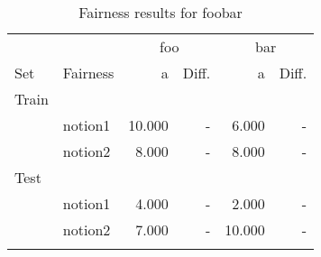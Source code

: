 \begin{table}[ht]
  \caption{Fairness results for foobar }%
  \begin{tabular}{llrrrr}
    \toprule
    & & \multicolumn{ 2 }{c}{ foo }& \multicolumn{ 2 }{c}{ bar } \\
    \cmidrule(lr){ 3-4}\cmidrule(l){ 5-6}
    Set & Fairness
    & a  & Diff.& a  & Diff. \\
    \midrule
      Train\\
      & notion1
      & 10.000 %
      & - 
      & 6.000 %
      & - 
      \\
      & notion2
      & 8.000 %
      & - 
      & 8.000 %
      & - 
      \\
      \addlinespace
      Test\\
      & notion1
      & 4.000 %
      & - 
      & 2.000 %
      & - 
      \\
      & notion2
      & 7.000 %
      & - 
      & 10.000 %
      & - 
      \\
      \addlinespace
    \bottomrule
  \end{tabular}
\end{table}
